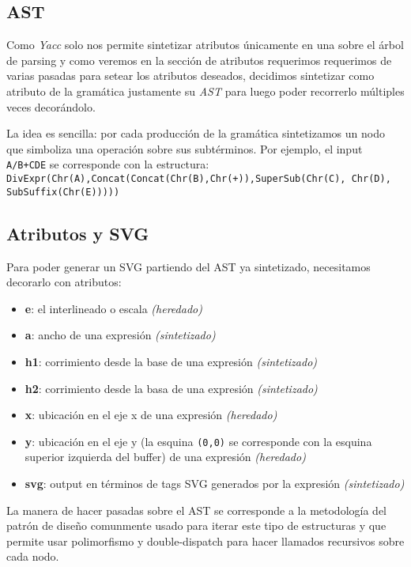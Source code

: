 \subsection{AST}

Como \emph{Yacc} solo nos permite sintetizar atributos únicamente en una  sobre el árbol de parsing y como veremos en la sección de atributos requerimos requerimos de varias pasadas para setear los atributos deseados, decidimos sintetizar como atributo de la gramática justamente su \emph{AST} para luego poder recorrerlo múltiples veces decorándolo. \newline

La idea es sencilla: por cada producción de la gramática sintetizamos un nodo que simboliza una operación sobre sus subtérminos. Por ejemplo, el input \texttt{A/B+C\super D\sub E} se corresponde con la estructura: \newline \texttt{DivExpr(Chr(A),Concat(Concat(Chr(B),Chr(+)),SuperSub(Chr(C), Chr(D), SubSuffix(Chr(E)))))
}

\subsection{Atributos y SVG}

Para poder generar un SVG partiendo del AST ya sintetizado, necesitamos decorarlo con atributos:

\begin{itemize}
	\item \textbf{e}: el interlineado o escala \emph{(heredado)}
	\item \textbf{a}: ancho de una expresión \emph{(sintetizado)}
	\item \textbf{h1}: corrimiento  desde la base de una expresión \emph{(sintetizado)}
	\item \textbf{h2}: corrimiento  desde la basa de una expresión \emph{(sintetizado)}
	\item \textbf{x}: ubicación en el eje x de una expresión \emph{(heredado)}
	\item \textbf{y}: ubicación en el eje y (la esquina \texttt{(0,0)} se corresponde con la esquina superior izquierda del buffer) de una expresión \emph{(heredado)}
	\item \textbf{svg}: output en términos de tags SVG generados por la expresión \emph{(sintetizado)}
\end{itemize}

La manera de hacer pasadas sobre el AST se corresponde a la metodología del patrón de diseño \emph{} comunmente usado para iterar este tipo de estructuras y que permite usar polimorfismo y double-dispatch para hacer llamados recursivos sobre cada nodo.

